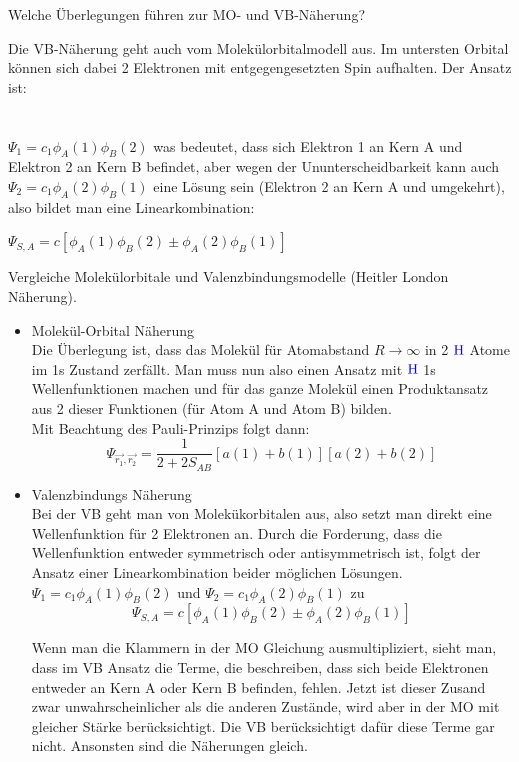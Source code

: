 \documentclass[a5paper,12pt,ngerman,print,grid=front]{kartei}
\let\oldce\ce
\renewcommand*{\ce}[1]{\begingroup\color{blue}\oldce{#1}\endgroup}
\begin{document}
\begin{karte}{
		Welche Überlegungen führen zur MO- und VB-Näherung?
		}
\begin{itemize}
		Die VB-Näherung geht auch vom Molekülorbitalmodell aus. 
		Im untersten Orbital können sich dabei 2 Elektronen mit entgegengesetzten Spin aufhalten. 
		Der Ansatz ist: \\ \\ \\
		$\Psi_1 = c_1 \phi_A(1) \phi_B(2)$ 
		was bedeutet, dass sich Elektron 1 an Kern A und Elektron 2 an Kern B befindet, 
		aber wegen der Ununterscheidbarkeit kann auch 
		$\Psi_2 = c_1 \phi_A(2) \phi_B(1)$
		eine Lösung sein (Elektron 2 an Kern A und umgekehrt), also bildet man eine Linearkombination:
		 
		$\Psi_{S,A} = c[ \phi_A(1) \phi_B(2) \pm \phi_A(2) \phi_B(1) ] $ 
			 
			
		\end{itemize}
		
	\end{karte}
		
		
	\begin{karte}{
		Vergleiche Molekülorbitale und Valenzbindungsmodelle (Heitler London Näherung).
		}
		
		\begin{itemize}
			\item Molekül-Orbital Näherung \\
			
			Die Überlegung ist, dass das Molekül für Atomabstand $R \rightarrow \infty$ in 2 
			$\ce{H}$ Atome im 1s Zustand zerfällt. 
			Man muss nun also einen Ansatz mit $\ce{H}$ 1s Wellenfunktionen machen und für 
			das ganze Molekül einen Produktansatz aus 2 dieser Funktionen 
			(für Atom A und Atom B) bilden. \\
			Mit Beachtung des Pauli-Prinzips folgt dann:
			$$\Psi_{\overrightarrow{r_1},\overrightarrow{r_2}} = 
			\frac{1}{2+2S_{AB}}[a(1)+b(1)][a(2)+b(2)]$$
			
			\item Valenzbindungs Näherung \\
			 
			 Bei der VB geht man von Molekükorbitalen aus, also setzt man direkt eine Wellenfunktion für 2 Elektronen an. Durch die Forderung, dass die Wellenfunktion entweder symmetrisch oder antisymmetrisch ist, folgt der Ansatz einer Linearkombination beider möglichen Lösungen.
			 $ \Psi_1 = c_1\phi_A(1)\phi_B(2) $ und $ \Psi_2 = c_1\phi_A(2)\phi_B(1) $ zu
			 $$  \Psi_{S,A} = c \left[   \phi_A(1) \phi_B(2) \pm   \phi_A(2) \phi_B(1)   \right]  $$
			 
			 Wenn man die Klammern in der MO Gleichung ausmultipliziert, sieht man, dass im VB Ansatz die Terme, die beschreiben, dass sich beide Elektronen entweder an Kern A oder Kern B befinden, fehlen.
			 Jetzt ist dieser Zusand zwar unwahrscheinlicher als die anderen Zustände, wird aber in der MO mit gleicher Stärke berücksichtigt. Die VB berücksichtigt dafür diese Terme gar nicht.
			 Ansonsten sind die Näherungen gleich.
			
		\end{itemize}
		
	\end{karte}
	
\end{document}
